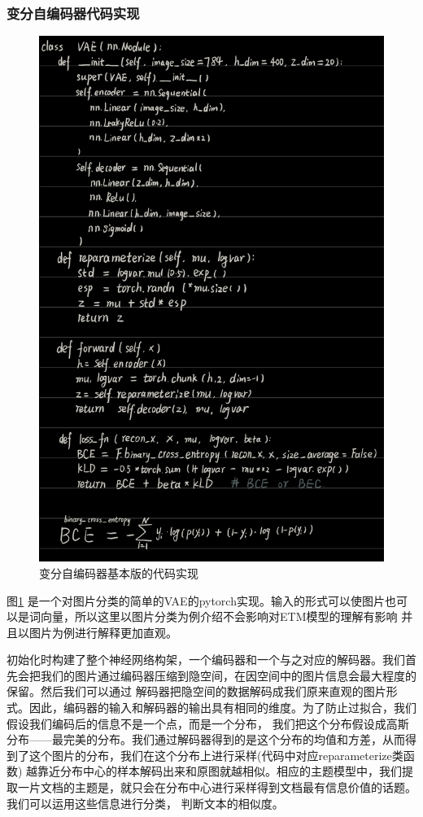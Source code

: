\documentclass[twocolumn]{article}
\begin{document}
\subsubsection{变分自编码器代码实现}
\begin{figure}
    \centering
    \includegraphics[width=0.9\linewidth]{figures/002.jpg}
    \caption{{\small 变分自编码器基本版的代码实现}}
    \label{fig:002}
\end{figure}
    图\ref{fig:002} 是一个对图片分类的简单的VAE的pytorch实现。输入的形式可以使图片也可以是词向量，所以这里以图片分类为例介绍不会影响对ETM模型的理解有影响
    并且以图片为例进行解释更加直观。
    
    初始化时构建了整个神经网络构架，一个编码器和一个与之对应的解码器。我们首先会把我们的图片通过编码器压缩到隐空间，在因空间中的图片信息会最大程度的保留。然后我们可以通过
    解码器把隐空间的数据解码成我们原来直观的图片形式。因此，编码器的输入和解码器的输出具有相同的维度。为了防止过拟合，我们假设我们编码后的信息不是一个点，而是一个分布，
    我们把这个分布假设成高斯分布——最完美的分布。我们通过解码器得到的是这个分布的均值和方差，从而得到了这个图片的分布，我们在这个分布上进行采样(代码中对应reparameterize类函数)
    越靠近分布中心的样本解码出来和原图就越相似。相应的主题模型中，我们提取一片文档的主题是，就只会在分布中心进行采样得到文档最有信息价值的话题。我们可以运用这些信息进行分类，
    判断文本的相似度。
    
\end{document}
